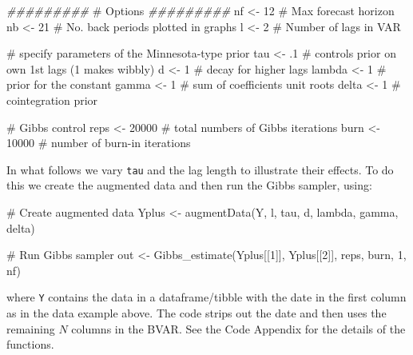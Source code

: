 \documentclass[
  letterpaper,
]{book}
\newenvironment{Shaded}{\begin{snugshade}}{\end{snugshade}}
\newcommand{\CommentTok}[1]{\textcolor[rgb]{0.37,0.37,0.37}{#1}}
\newcommand{\DecValTok}[1]{\textcolor[rgb]{0.68,0.00,0.00}{#1}}
\newcommand{\DocumentationTok}[1]{\textcolor[rgb]{0.37,0.37,0.37}{\textit{#1}}}
\newcommand{\FunctionTok}[1]{\textcolor[rgb]{0.28,0.35,0.67}{#1}}
\newcommand{\NormalTok}[1]{\textcolor[rgb]{0.00,0.23,0.31}{#1}}
\newcommand{\OtherTok}[1]{\textcolor[rgb]{0.00,0.23,0.31}{#1}}
\begin{document}
\begin{Shaded}
\begin{Highlighting}[]
\DocumentationTok{\#\#\#\#\#\#\#\#\#}
\CommentTok{\# Options}
\DocumentationTok{\#\#\#\#\#\#\#\#\#}
\NormalTok{nf }\OtherTok{\textless{}{-}} \DecValTok{12} \CommentTok{\# Max forecast horizon}
\NormalTok{nb }\OtherTok{\textless{}{-}} \DecValTok{21} \CommentTok{\# No. back periods plotted in graphs}
\NormalTok{l  }\OtherTok{\textless{}{-}} \DecValTok{2}  \CommentTok{\# Number of lags in VAR}

\CommentTok{\# specify parameters of the Minnesota{-}type prior}
\NormalTok{tau    }\OtherTok{\textless{}{-}}\NormalTok{ .}\DecValTok{1}   \CommentTok{\# controls prior on own 1st lags (1 makes wibbly)}
\NormalTok{d      }\OtherTok{\textless{}{-}} \DecValTok{1}    \CommentTok{\# decay for higher lags}
\NormalTok{lambda }\OtherTok{\textless{}{-}} \DecValTok{1}    \CommentTok{\# prior for the constant}
\NormalTok{gamma  }\OtherTok{\textless{}{-}} \DecValTok{1}    \CommentTok{\# sum of coefficients unit roots}
\NormalTok{delta  }\OtherTok{\textless{}{-}} \DecValTok{1}    \CommentTok{\# cointegration prior}

\CommentTok{\# Gibbs control}
\NormalTok{reps }\OtherTok{\textless{}{-}} \DecValTok{20000} \CommentTok{\# total numbers of Gibbs iterations}
\NormalTok{burn }\OtherTok{\textless{}{-}} \DecValTok{10000} \CommentTok{\# number of burn{-}in iterations}
\end{Highlighting}
\end{Shaded}

In what follows we vary \texttt{tau} and the lag length to illustrate
their effects. To do this we create the augmented data and then run the
Gibbs sampler, using:

\begin{Shaded}
\begin{Highlighting}[]
\CommentTok{\# Create augmented data}
\NormalTok{Yplus }\OtherTok{\textless{}{-}} \FunctionTok{augmentData}\NormalTok{(Y, l, tau, d, lambda, gamma, delta)}

\CommentTok{\# Run Gibbs sampler}
\NormalTok{out   }\OtherTok{\textless{}{-}} \FunctionTok{Gibbs\_estimate}\NormalTok{(Yplus[[}\DecValTok{1}\NormalTok{]], Yplus[[}\DecValTok{2}\NormalTok{]], reps, burn, }\DecValTok{1}\NormalTok{, nf)}
\end{Highlighting}
\end{Shaded}

where \texttt{Y} contains the data in a dataframe/tibble with the date
in the first column as in the data example above. The code strips out
the date and then uses the remaining \(N\) columns in the BVAR. See the
Code Appendix for the details of the functions.
\end{document}
